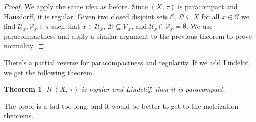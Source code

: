 \documentclass{article}
\theoremstyle{plain}
\newtheorem{theorem}{Theorem}[section]
\theoremstyle{normal}
\begin{document}
        \begin{proof}
            We apply the same idea as before. Since $(X,\,\tau)$ is paracompact
            and Hausdorff, it is regular. Given two closed disjoint sets
            $\mathcal{C},\mathcal{D}\subseteq{X}$ for all
            $x\in\mathcal{C}$ we find $\mathcal{U}_{x},\mathcal{V}_{x}\in\tau$
            such that $x\in\mathcal{U}_{x}$,
            $\mathcal{D}\subseteq\mathcal{V}_{x}$, and
            $\mathcal{U}_{x}\cap\mathcal{V}_{x}=\emptyset$. We use
            paracompactness and apply a similar argument to the previous theorem
            to prove normality.
        \end{proof}
        There's a partial reverse for paracompactness and regularity. If we
        add Lindel\"{o}f, we get the following theorem.
        \begin{theorem}
            If $(X,\,\tau)$ is regular and Lindel\"{o}f, then it is paracompact.
        \end{theorem}
        The proof is a tad too long, and it would be better to get to the
        metrization theorems.
\end{document}
